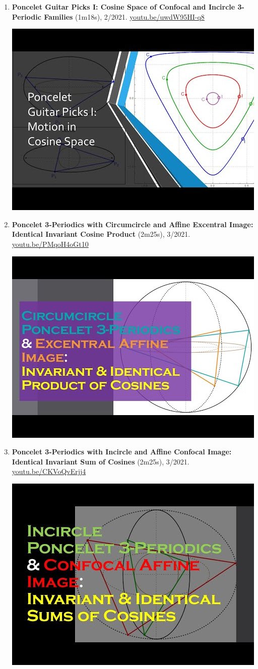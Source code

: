 \documentclass[12pt]{article}
\begin{document}
\begin{enumerate}[resume]
\item \textbf{Poncelet Guitar Picks I: Cosine Space of Confocal and Incircle 3-Periodic Families} (1m18s), 2/2021. \href{https://youtu.be/uwdW95HI-q8}{\url{youtu.be/uwdW95HI-q8}}
\begin{center}\includegraphics[width=.5\textwidth]{pics/uwdW95HI-q8.jpg}\end{center}
% 
\item \textbf{Poncelet 3-Periodics with Circumcircle and Affine Excentral Image: Identical Invariant Cosine Product} (2m25s), 3/2021. \href{https://youtu.be/PMqoH4oGt10}{\url{youtu.be/PMqoH4oGt10}}
\begin{center}\includegraphics[width=.5\textwidth]{pics/PMqoH4oGt10.jpg}\end{center}
% 
\item \textbf{Poncelet 3-Periodics with Incircle and Affine Confocal Image: Identical Invariant Sum of Cosines} (2m25s), 3/2021. \href{https://youtu.be/CKVoQvErjj4}{\url{youtu.be/CKVoQvErjj4}}
\begin{center}\includegraphics[width=.5\textwidth]{pics/CKVoQvErjj4.jpg}\end{center}
% 
\end{enumerate}
\end{document}
